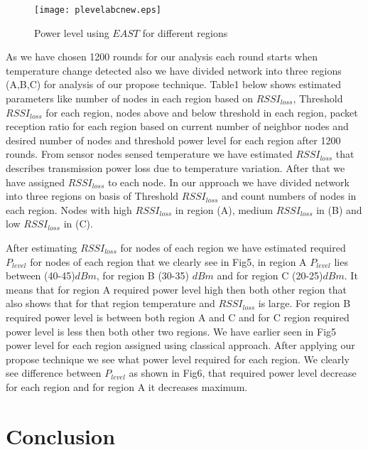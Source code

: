 \documentclass{article}
\begin{document}
\begin{figure}[h]
\begin{center}
\texttt{[image: plevelabcnew.eps]}
\vspace{-0.5cm}
\caption{Power level using $EAST$ for different regions}
\end{center}
\end{figure}

As we have chosen 1200 rounds for our analysis each round starts when temperature change detected also we have divided network into three regions (A,B,C) for analysis of our propose technique. Table1 below shows estimated parameters like number of nodes in each region based on $RSSI_{loss}$, Threshold $RSSI_{loss}$ for each region, nodes above and below threshold in each region, packet reception ratio for each region based on current number of neighbor nodes and desired number of nodes and threshold power level for each region after 1200 rounds. From sensor nodes sensed temperature we have estimated $RSSI_{loss}$ that describes transmission power loss due to temperature variation. After that we have assigned $RSSI_{loss}$ to each node. In our approach we have divided network into three regions on basis of Threshold $RSSI_{loss}$ and count numbers of nodes in each region. Nodes with high $RSSI_{loss}$ in region (A), medium $RSSI_{loss}$ in (B) and low $RSSI_{loss}$ in (C).


After estimating $RSSI_{loss}$ for nodes of each region we have estimated required $P_{level}$ for nodes of each region that we clearly see in Fig5, in region A $P_{level}$ lies between (40-45)$dBm$, for region B (30-35) $dBm$ and for region C (20-25)$dBm$. It means that for region A required power level high then both other region that also shows that for that region temperature and $RSSI_{loss}$ is large. For region B required power level is between both region A and C and for C region required power level is less then both other two regions. We have earlier seen in Fig5 power level for each region assigned using classical approach. After applying our propose technique we see what power level required for each region. We clearly see difference  between $P_{level}$ as shown in Fig6, that required power level decrease for each region and for region A it decreases maximum.

\section{Conclusion}
\label{sec:majhead}
\end{document}
